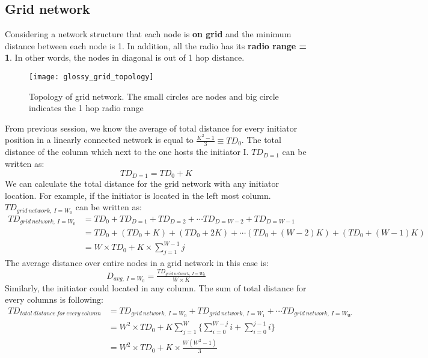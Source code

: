 \clearpage
\subsection{Grid network}
Considering a network structure that each node is {\bf on grid} and the minimum distance between
each node is 1. In addition, all the radio has its {\bf radio range = 1}. In other words, the nodes
in diagonal is out of 1 hop distance.
\begin{figure}[h]
\centering
	\texttt{[image: glossy\_grid\_topology]}
	\caption{Topology of grid network. The small circles are nodes and big circle indicates the 
	1 hop radio range}
\end{figure}

From previous session, we know the average of total distance for every initiator position in a linearly 
connected network is equal to $\tfrac{K^2-1}{3}\equiv TD_0$. 
The total distance of the column which next to the one hosts the initiator I. $TD_{D=1}$ can be written
as:
\begin{equation}
 TD_{D=1} = TD_0 + K 
\end{equation}
We can calculate the total distance for the grid network with any initiator location.
For example, if the initiator is located in the left most column. $TD_{grid\ network,\ I=W_0}$ can be written as:
\begin{align}
	\nonumber
	TD_{grid\ network,\ I=W_0} 	&= TD_0 + TD_{D=1} + TD_{D=2} +\cdots TD_{D=W-2} + TD_{D=W-1}\\
						&= TD_0 + (TD_0+K) + (TD_0+2K) +\cdots (TD_0 + (W-2)K) + (TD_0 + (W-1)K)\\
						&= W\times TD_0 + K\times \displaystyle\sum\limits_{j=1}^{W-1} j
\end{align}
The average distance over entire nodes in a grid network in this case is:
\begin{equation}
	D_{avg,\ I=W_0} = \tfrac{TD_{grid\ network,\ I=W_0}}{W\times K}
\end{equation}
Similarly, the initiator could located in any column. The sum of total distance for every columns is following:
\begin{align}
	\nonumber
	TD_{total\ distance\ for\ every\ column}	&= TD_{grid\ network,\ I=W_0} + TD_{grid\ network,\ I=W_1} 
	+ \cdots TD_{grid\ network,\ I=W_W}\\ 
	&= W^2\times TD_0 + K\displaystyle\sum\limits_{j=1}^W\{\displaystyle\sum\limits_{i=0}^{W-j} i + \displaystyle\sum\limits_{i=0}^{j-1} i\}\\
	&= W^2\times TD_0 + K\times\tfrac{W(W^2-1)}{3}
\end{align}
